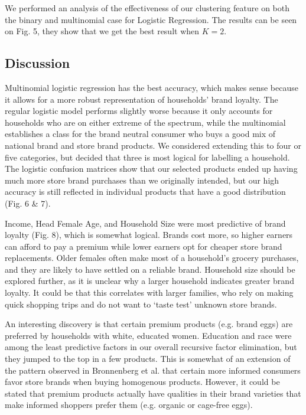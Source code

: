 \documentclass[conference]{IEEEtran}
\begin{document}
We performed an analysis of the effectiveness of our clustering feature on both the binary and multinomial case for Logistic Regression. The results can be seen on Fig. 5, they show that we get the best result when $K=2$.

\subsection{Discussion}
Multinomial logistic regression has the best accuracy, which makes sense because it allows for a more robust representation of households’ brand loyalty. The regular logistic model performs slightly worse because it only accounts for households who are on either extreme of the spectrum, while the multinomial establishes a class for the brand neutral consumer who buys a good mix of national brand and store brand products. We considered extending this to four or five categories, but decided that three is most logical for labelling a household. The logistic confusion matrices show that our selected products ended up having much more store brand purchases than we originally intended, but our high accuracy is still reflected in individual products that have a good distribution (Fig. 6 \& 7).


Income, Head Female Age, and Household Size were most predictive of brand loyalty (Fig. 8), which is somewhat logical. Brands cost more, so higher earners can afford to pay a premium while lower earners opt for cheaper store brand replacements. Older females often make most of a household’s grocery purchases, and they are likely to have settled on a reliable brand. Household size should be explored further, as it is unclear why a larger household indicates greater brand loyalty. It could be that this correlates with larger families, who rely on making quick shopping trips and do not want to `taste test' unknown store brands. 


An interesting discovery is that certain premium products (e.g. brand eggs) are preferred by households with white, educated women. Education and race were among the least predictive factors in our overall recursive factor elimination, but they jumped to the top in a few products. This is somewhat of an extension of the pattern observed in Bronnenberg et al.\cite{bronnenberg2014pharmacists} that certain more informed consumers favor store brands when buying homogenous products. However, it could be stated that premium products actually have qualities in their brand varieties that make informed shoppers prefer them (e.g. organic or cage-free eggs).
\end{document}
